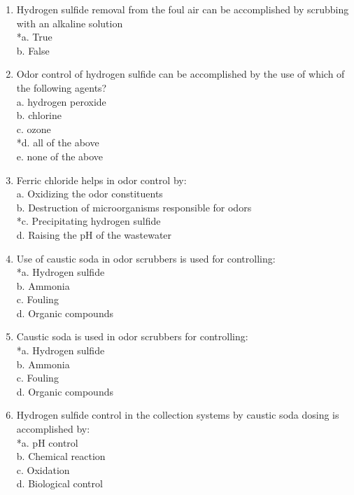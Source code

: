 \begin{enumerate}
\item  Hydrogen sulfide removal from the foul air can be accomplished by scrubbing with an alkaline solution \\

*a. True \\
b. False \\


\item Odor control of hydrogen sulfide can be accomplished by the use of which of the following agents? \\

a. hydrogen peroxide \\
b. chlorine \\
c. ozone \\
*d. all of the above \\
e. none of the above 

\item Ferric chloride helps in odor control by:\\

a. Oxidizing the odor constituents\\
b. Destruction of microorganisms responsible for odors \\
*c. Precipitating hydrogen sulfide \\
d. Raising the pH of the wastewater \\

\item Use of caustic soda in odor scrubbers is used for controlling:\\

*a. Hydrogen sulfide\\
b. Ammonia \\
c. Fouling\\
d. Organic compounds\\

\item Caustic soda is used in odor scrubbers for controlling:\\

*a. Hydrogen sulfide\\
b. Ammonia \\
c. Fouling\\
d. Organic compounds\\


\item Hydrogen sulfide control in the collection systems by caustic soda dosing is accomplished by: \\

*a. pH control\\
b. Chemical reaction\\
c. Oxidation \\
d. Biological control\\



\end{enumerate}

